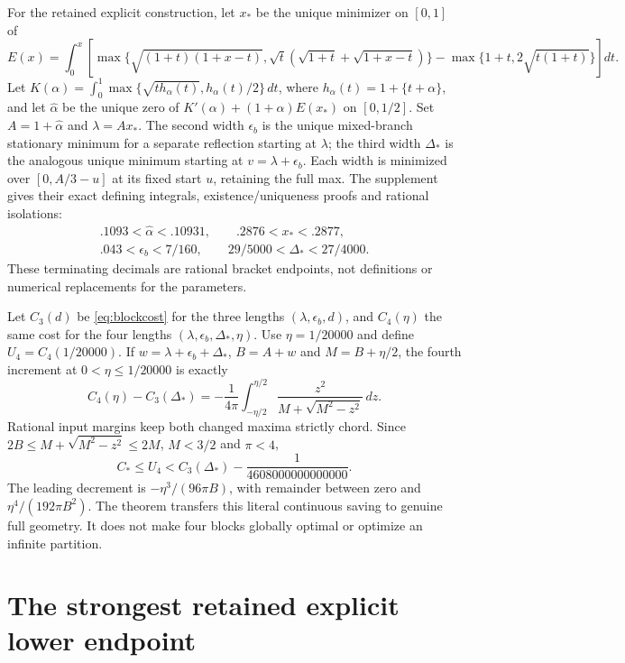 \documentclass[11pt]{article}
\theoremstyle{definition}\newtheorem{definition}[theorem]{Definition}
\theoremstyle{remark}\newtheorem{remark}[theorem]{Remark}
\newcommand{\CC}{C_\ast}
\begin{document}
For the retained explicit construction, let $x_*$ be the unique minimizer
on $[0,1]$ of
\[
 E(x)=\int_0^x\!\left[
 \max\{\sqrt{(1+t)(1+x-t)},\sqrt t(\sqrt{1+t}+\sqrt{1+x-t})\}
 -\max\{1+t,2\sqrt{t(1+t)}\}\right]dt.
\]
Let $K(\alpha)=\int_0^1\max\{\sqrt{t h_\alpha(t)},h_\alpha(t)/2\}\,dt$,
where $h_\alpha(t)=1+\{t+\alpha\}$, and let $\widehat\alpha$ be the
unique zero of $K'(\alpha)+(1+\alpha)E(x_*)$ on $[0,1/2]$.
Set $A=1+\widehat\alpha$ and $\lambda=Ax_*$.
The second width $\epsilon_b$ is the unique mixed-branch stationary
minimum for a separate reflection starting at $\lambda$; the third width
$\Delta_*$ is the analogous unique minimum starting at
$v=\lambda+\epsilon_b$. Each width is minimized over
$[0,A/3-u]$ at its fixed start $u$, retaining the full max.
The supplement \cite{upperinputs} gives their exact defining integrals,
existence/uniqueness proofs and rational isolations:
\[
\begin{gathered}
 .1093<\widehat\alpha<.10931,\qquad .2876<x_*<.2877,\\
 .043<\epsilon_b<7/160,\qquad 29/5000<\Delta_*<27/4000.
\end{gathered}
\]
These terminating decimals are rational bracket endpoints, not definitions
or numerical replacements for the parameters.

Let $C_3(d)$ be \eqref{eq:blockcost} for the three lengths
$(\lambda,\epsilon_b,d)$, and $C_4(\eta)$ the same cost for the four
lengths $(\lambda,\epsilon_b,\Delta_*,\eta)$.
Use $\eta=1/20000$ and define $U_4=C_4(1/20000)$.
If $w=\lambda+\epsilon_b+\Delta_*$, $B=A+w$ and
$M=B+\eta/2$, the fourth increment at $0<\eta\le1/20000$ is exactly
\[
 C_4(\eta)-C_3(\Delta_*)=
 -\frac1{4\pi}\int_{-\eta/2}^{\eta/2}
       \frac{z^2}{M+\sqrt{M^2-z^2}}\,dz.
\]
Rational input margins keep both changed maxima strictly chord.
Since $2B\le M+\sqrt{M^2-z^2}\le2M$, $M<3/2$ and $\pi<4$,
\begin{equation}\label{eq:U4}
 \CC\le U_4<C_3(\Delta_*)-\frac1{4608000000000000}.
\end{equation}
The leading decrement is $-\eta^3/(96\pi B)$, with remainder between
zero and $\eta^4/(192\pi B^2)$. The theorem transfers this literal
continuous saving to genuine full geometry. It does not make four blocks
globally optimal or optimize an infinite partition.

\section{The strongest retained explicit lower endpoint}
\end{document}
